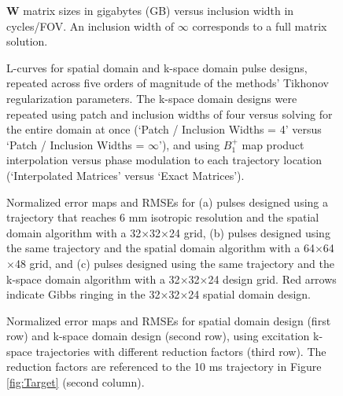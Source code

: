 \documentclass[11pt]{article}
\begin{document}
\begin{figure}
\centering
\caption{$\bm{W}$ matrix sizes in gigabytes (GB) versus inclusion width in cycles/FOV. 
An inclusion width of $\infty$ corresponds to a full matrix solution.}
\label{fig:wsize}
\end{figure}

\begin{figure}
	\centering
	\caption{L-curves for spatial domain and k-space domain pulse designs, 
	repeated across five orders of magnitude of the methods' Tikhonov regularization parameters.
	The k-space domain designs were repeated using patch and inclusion widths of four versus solving for the entire domain at once (`Patch / Inclusion Widths = 4' versus `Patch / Inclusion Widths = $\infty$'),
	and using $B_1^+$ map product interpolation versus phase modulation to each trajectory location (`Interpolated Matrices' versus
	`Exact Matrices').}
	\label{fig:LCurves}
\end{figure}


\begin{figure}
	\centering
	\caption{Normalized error maps and RMSEs for 
	(a) pulses designed using a trajectory that reaches 6 mm isotropic resolution
	and the spatial domain algorithm with a 32$\times$32$\times$24 grid, 
	(b) pulses designed using the same trajectory and the spatial domain algorithm with a 64$\times$64$\times$48 grid,  
	and (c) pulses designed using the same trajectory and the k-space domain algorithm with a 32$\times$32$\times$24 design grid. 
	Red arrows indicate Gibbs ringing in the 32$\times$32$\times$24 spatial domain design.}
	\label{fig:GibbsRing}
\end{figure}


\begin{figure}
	\centering
	\caption{Normalized error maps and RMSEs for spatial domain design (first row) and k-space domain design (second row), 
	using excitation k-space trajectories with different reduction factors (third row).
	The reduction factors are referenced to the 10 ms trajectory in Figure \ref{fig:Target} (second column).}
	\label{fig:kspace_PTX_Acceleration}
\end{figure}
\end{document}
